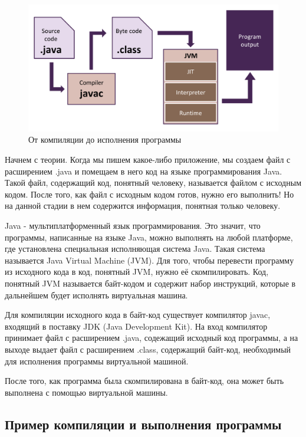 \documentclass[]{scrartcl}
\begin{document}
\begin{figure}[h]
	\includegraphics[width=\linewidth]{from-source-to-program.png}
	\caption{От компиляции до исполнения программы}
\end{figure}


Начнем с теории. Когда мы пишем какое-либо приложение, мы создаем файл с расширением .java и помещаем в него код на языке программирования Java. Такой файл, содержащий код, понятный человеку, называется файлом с исходным кодом. После того, как файл с исходным кодом готов, нужно его выполнить! Но на данной стадии в нем содержится информация, понятная только человеку. 

Java - мультиплатформенный язык программирования. Это значит, что программы, написанные на языке Java, можно выполнять на любой платформе, где установлена специальная исполняющая система Java. Такая система называется Java Virtual Machine (JVM). Для того, чтобы перевести программу из исходного кода в код, понятный JVM, нужно её скомпилировать. Код, понятный JVM называется байт-кодом и содержит набор инструкций, которые в дальнейшем будет исполнять виртуальная машина.

Для компиляции исходного кода в байт-код существует компилятор javac, входящий в поставку JDK (Java Development Kit). На вход компилятор принимает файл с расширением .java, содежащий исходный код программы, а на выходе выдает файл с расширением .class, содержащий байт-код, необходимый для исполнения программы виртуальной машиной.

После того, как программа была скомпилирована в байт-код, она может быть выполнена с помощью виртуальной машины.

\subsection{Пример компиляции и выполнения программы}
\end{document}
